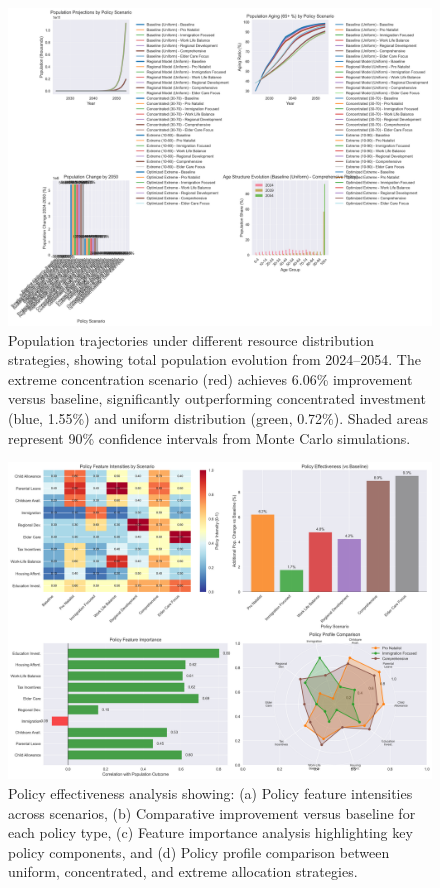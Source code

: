 \documentclass{article} %
\begin{document}
\begin{figure}[t]
    \centering
    \includegraphics[width=\textwidth]{population_projections.png}
    \caption{Population trajectories under different resource distribution strategies, showing total population evolution from 2024--2054. The extreme concentration scenario (red) achieves 6.06\% improvement versus baseline, significantly outperforming concentrated investment (blue, 1.55\%) and uniform distribution (green, 0.72\%). Shaded areas represent 90\% confidence intervals from Monte Carlo simulations.}
    \label{fig:population_projections}
\end{figure}

\begin{figure}[t]
    \centering
    \includegraphics[width=\textwidth]{policy_analysis.png}
    \caption{Policy effectiveness analysis showing: (a) Policy feature intensities across scenarios, (b) Comparative improvement versus baseline for each policy type, (c) Feature importance analysis highlighting key policy components, and (d) Policy profile comparison between uniform, concentrated, and extreme allocation strategies.}
    \label{fig:policy_analysis}
\end{figure}
\end{document}
